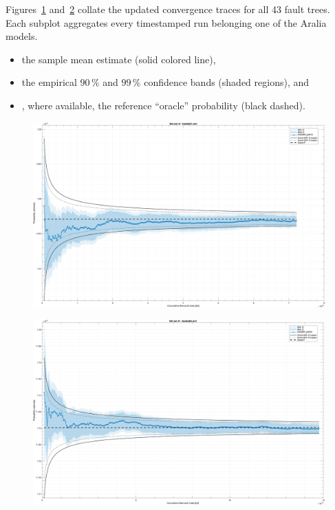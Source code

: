 Figures~\ref{fig:conv_fig_01} and~\ref{fig:conv_fig_02} collate the updated convergence traces for all 43 fault trees.  Each subplot aggregates every timestamped run belonging one of the Aralia models.
\begin{itemize}
  \item the sample mean estimate (solid colored line),
  \item the empirical $90\,\%$ and $99\,\%$ confidence bands (shaded regions), and
  \item, where available, the reference ``oracle'' probability (black dashed).
\end{itemize}
\begin{landscape}

\begin{figure}
    \centering
    \includegraphics[width=1\textwidth]{figs/convergence/e001p99/conv_fig_01.png}
    \caption{}
    \label{fig:conv_fig_01}
\end{figure}

\begin{figure}
    \centering
    \includegraphics[width=1\textwidth]{figs/convergence/e001p99/conv_fig_02.png}
    \caption{}
    \label{fig:conv_fig_02}
\end{figure}
\end{landscape}


